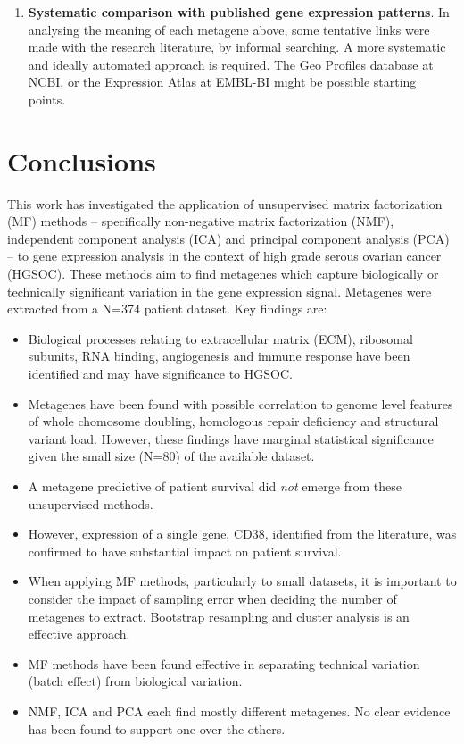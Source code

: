 \documentclass[tikz, 11pt,a4paper,oneside,fleqn]{article}
\begin{document}
\begin{enumerate}
\item
{\bf Systematic comparison with published gene expression patterns}.  In analysing the meaning of each metagene above, some tentative links were made with the research literature, by informal searching.   A more systematic and ideally automated approach is required.  The \href{https://www.ncbi.nlm.nih.gov/geoprofiles}{Geo Profiles database} at NCBI, or the \href{https://www.ebi.ac.uk/gxa/home}{Expression Atlas} at EMBL-BI might be possible starting points.

\end{enumerate}

\clearpage

\section{Conclusions}

This work has investigated the application of unsupervised matrix factorization (MF) methods  -- specifically non-negative matrix factorization (NMF), independent component analysis (ICA) and principal component analysis (PCA) -- to gene expression analysis in the context of high grade serous ovarian cancer (HGSOC).  These methods aim to find metagenes which capture biologically or technically significant variation in the gene expression signal.  Metagenes were extracted from a N=374 patient dataset. Key findings are:
\begin{itemize}
\item
Biological processes relating to  extracellular matrix (ECM), ribosomal subunits, RNA binding, angiogenesis and immune response have been identified and may have significance to HGSOC.
\item
Metagenes have been found with possible correlation to genome level features of whole chomosome doubling, homologous repair deficiency and structural variant load.  However, these findings have marginal statistical significance given the small size (N=80) of the available dataset.
\item
A metagene predictive of patient survival did \emph{not} emerge from these unsupervised methods.
\item
However, expression of a single gene, CD38, identified from the literature, was confirmed to have substantial impact on patient survival.
\item
When applying MF methods, particularly to small datasets, it is important to consider the impact of sampling error when deciding the number of metagenes to extract.  Bootstrap resampling and cluster analysis is an effective approach.
\item
MF methods have been found effective in separating technical variation (batch effect) from biological variation.
\item
NMF, ICA and PCA each find mostly different metagenes. No clear evidence has been found to support one over the others.

\end{itemize}
\end{document}
